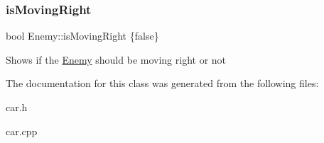 \subsubsection{\texorpdfstring{is\+Moving\+Right}{isMovingRight}}
{\footnotesize\ttfamily bool Enemy\+::is\+Moving\+Right \{false\}}

Shows if the \hyperlink{classEnemy}{Enemy} should be moving right or not 

The documentation for this class was generated from the following files\+:\begin{DoxyCompactItemize}
\item 
car.\+h\item 
car.\+cpp\end{DoxyCompactItemize}
